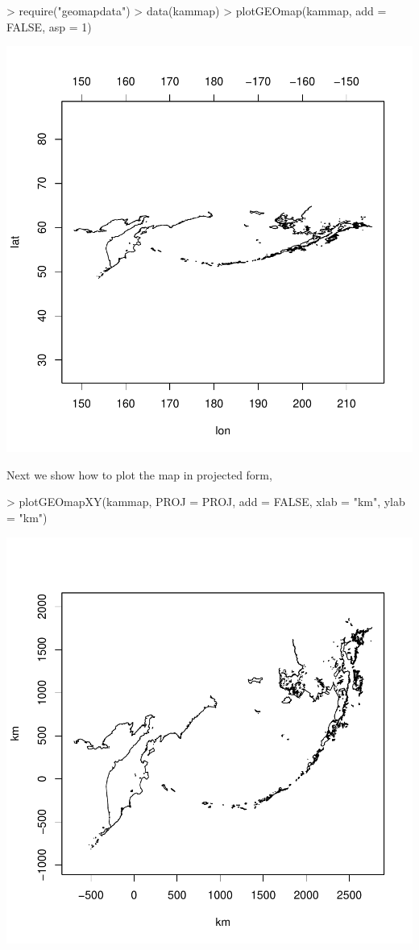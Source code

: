 \documentclass{article}
\begin{document}
\begin{Schunk}
\begin{Sinput}
> require("geomapdata")
> data(kammap)
> plotGEOmap(kammap, add = FALSE, asp = 1)
\end{Sinput}
\end{Schunk}
\includegraphics{gmap-003}

Next we show how to plot the map in projected form,
\begin{Schunk}
\begin{Sinput}
> plotGEOmapXY(kammap, PROJ = PROJ, add = FALSE, xlab = "km", ylab = "km")
\end{Sinput}
\end{Schunk}
\includegraphics{gmap-004}
\end{document}
